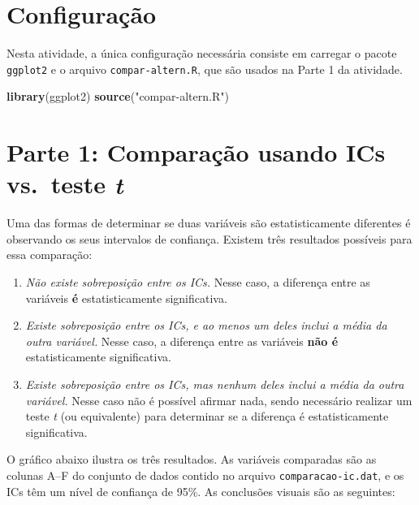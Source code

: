 \documentclass[
]{article}
\newenvironment{Shaded}{\begin{snugshade}}{\end{snugshade}}
\newcommand{\FunctionTok}[1]{\textcolor[rgb]{0.13,0.29,0.53}{\textbf{#1}}}
\newcommand{\NormalTok}[1]{#1}
\newcommand{\StringTok}[1]{\textcolor[rgb]{0.31,0.60,0.02}{#1}}
\providecommand{\tightlist}{%
  \setlength{\itemsep}{0pt}\setlength{\parskip}{0pt}}
\begin{document}
\hypertarget{configurauxe7uxe3o}{%
\section{Configuração}\label{configurauxe7uxe3o}}

Nesta atividade, a única configuração necessária consiste em carregar o
pacote \texttt{ggplot2} e o arquivo \texttt{compar-altern.R}, que são
usados na Parte 1 da atividade.

\begin{Shaded}
\begin{Highlighting}[]
\FunctionTok{library}\NormalTok{(ggplot2)}
\FunctionTok{source}\NormalTok{(}\StringTok{"compar{-}altern.R"}\NormalTok{)}
\end{Highlighting}
\end{Shaded}

\hypertarget{parte-1-comparauxe7uxe3o-usando-ics-vs.-teste-t}{%
\section{\texorpdfstring{Parte 1: Comparação usando ICs vs.~teste
\emph{t}}{Parte 1: Comparação usando ICs vs.~teste t}}\label{parte-1-comparauxe7uxe3o-usando-ics-vs.-teste-t}}

Uma das formas de determinar se duas variáveis são estatisticamente
diferentes é observando os seus intervalos de confiança. Existem três
resultados possíveis para essa comparação:

\begin{enumerate}
\def\labelenumi{\arabic{enumi}.}
\tightlist
\item
  \emph{Não existe sobreposição entre os ICs.} Nesse caso, a diferença
  entre as variáveis \textbf{é} estatisticamente significativa.\\
\item
  \emph{Existe sobreposição entre os ICs, e ao menos um deles inclui a
  média da outra variável.} Nesse caso, a diferença entre as variáveis
  \textbf{não é} estatisticamente significativa.
\item
  \emph{Existe sobreposição entre os ICs, mas nenhum deles inclui a
  média da outra variável.} Nesse caso não é possível afirmar nada,
  sendo necessário realizar um teste \emph{t} (ou equivalente) para
  determinar se a diferença é estatisticamente significativa.
\end{enumerate}

O gráfico abaixo ilustra os três resultados. As variáveis comparadas são
as colunas A--F do conjunto de dados contido no arquivo
\texttt{comparacao-ic.dat}, e os ICs têm um nível de confiança de 95\%.
As conclusões visuais são as seguintes:
\end{document}
